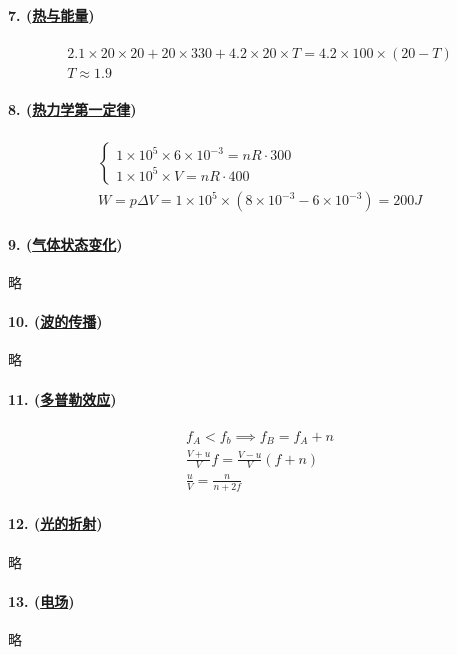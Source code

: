 \paragraph{7. (\hyperref[sec:热与能量]{热与能量})}

\begin{gather*}
    2.1\times20\times20+20\times330+4.2\times20\times T=4.2\times100\times(20-T)\\
    T\approx 1.9
\end{gather*}

\paragraph{8. (\hyperref[subsec:热力学第一定律]{热力学第一定律})}

\begin{gather*}
    \begin{cases}
        1\times10^5\times6\times10^{-3}=nR\cdot300\\
        1\times10^5\times V=nR\cdot 400
    \end{cases}\\
    W=p\Delta V=1\times10^5\times(8\times10^{-3}-6\times10^{-3})=200J
\end{gather*}

\paragraph{9. (\hyperref[subsec:气体状态变化]{气体状态变化})} 略
\paragraph{10. (\hyperref[subsec:波的传播]{波的传播})} 略
\paragraph{11. (\hyperref[subsec:多普勒效应]{多普勒效应})}

\begin{gather*}
    f_A<f_b\implies f_B=f_A+n\\
    \frac{V+u}{V}f=\frac{V-u}{V}(f+n)\\
    \frac{u}{V}=\frac{n}{n+2f}
\end{gather*}

\paragraph{12. (\hyperref[subsec:光的折射]{光的折射})} 略
\paragraph{13. (\hyperref[subsec:电场]{电场})} 略
